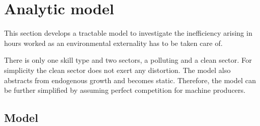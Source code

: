 \section{Analytic model}
This section develops a tractable model to investigate the inefficiency arising in hours worked as an environmental externality has to be taken care of. 

There is only one skill type and two sectors, a polluting and a clean sector. For simplicity the clean sector does not exert any distortion. The model also abstracts from endogenous growth and becomes static. Therefore, the model can be further simplified by assuming perfect competition for machine producers.
\subsection{Model}
